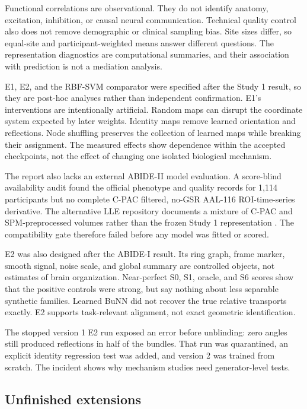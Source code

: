 \documentclass[11pt,a4paper]{article}
\begin{document}
Functional correlations are observational. They do not identify anatomy,
excitation, inhibition, or causal neural communication. Technical quality
control also does not remove demographic or clinical sampling bias. Site sizes
differ, so equal-site and participant-weighted means answer different
questions. The representation diagnostics are computational summaries, and
their association with prediction is not a mediation analysis.

E1, E2, and the RBF-SVM comparator were specified after the Study 1 result, so
they are post-hoc analyses rather than independent confirmation. E1's interventions are intentionally
artificial. Random maps can disrupt the coordinate system expected by later
weights. Identity maps remove learned orientation and reflections. Node
shuffling preserves the collection of learned maps while breaking their
assignment. The measured effects show dependence within the accepted
checkpoints, not the effect of changing one isolated biological mechanism.

The report also lacks an external ABIDE-II model evaluation. A score-blind
availability audit found the official phenotype and quality records for 1,114
participants but no complete C-PAC filtered, no-GSR AAL-116 ROI-time-series
derivative. The alternative LLE repository documents a mixture of C-PAC and
SPM-preprocessed volumes rather than the frozen Study 1 representation
\cite{abideii_release,abide_lle}. The compatibility gate therefore failed
before any model was fitted or scored.

E2 was also designed after the ABIDE-I result. Its ring graph, frame marker,
smooth signal, noise scale, and global summary are controlled objects, not
estimates of brain organization. Near-perfect S0, S1, oracle, and S6 scores
show that the positive controls were strong, but say nothing about less
separable synthetic families. Learned BuNN did not recover the true relative
transports exactly. E2 supports task-relevant alignment, not exact geometric
identification.

The stopped version 1 E2 run exposed an error before unblinding: zero angles
still produced reflections in half of the bundles. That run was quarantined,
an explicit identity regression test was added, and version 2 was trained from
scratch. The incident shows why mechanism studies need generator-level tests.

\subsection{Unfinished extensions}
\end{document}
